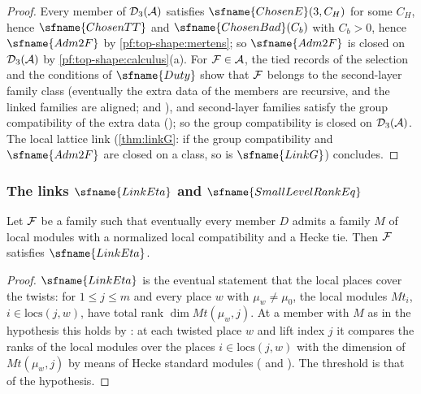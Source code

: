 \begin{proof}
Every member of $\mathcal{D}_3(\mathcal A)$ satisfies $\sfname{ChosenE}(3,C_H)$ for some $C_H$, hence
$\sfname{ChosenTT}$ and $\sfname{ChosenBad}(C_b)$ with $C_b>0$, hence $\sfname{Adm2F}$ by \cref{pf:top-shape:mertens};
so $\sfname{Adm2F}$ is closed on $\mathcal{D}_3(\mathcal A)$ by \cref{pf:top-shape:calculus}(a). For
$\mathcal{F}\in\mathcal A$, the tied records of the selection and the conditions of $\sfname{Duty}$ show that
$\mathcal{F}$ belongs to the second-layer family class (eventually the extra data of the members are recursive,
and the linked families are aligned;  and ),
and second-layer families satisfy the group compatibility of the extra data
(); so the group compatibility is closed on
$\mathcal{D}_3(\mathcal A)$. The local lattice link  (\cref{thm:linkG}: if the
group compatibility and $\sfname{Adm2F}$ are closed on a class, so is $\sfname{LinkG}$) concludes.
\end{proof}

\subsubsection*{The links $\sfname{LinkEta}$ and $\sfname{SmallLevelRankEq}$}

\begin{lemma}\label{pf:top-shape:etaclosed}
Let $\mathcal{F}$ be a family such that eventually every member $D$ admits a family $M$ of local modules with a
normalized local compatibility and a Hecke tie. Then $\mathcal{F}$ satisfies $\sfname{LinkEta}$.
\end{lemma}

\begin{proof}
$\sfname{LinkEta}$ is the eventual statement that the local places cover the twists: for $1\le j\le m$ and every place
$w$ with $\mu_w\ne\mu_0$, the local modules $\mathit{Mt}_i$, $i\in\mathrm{locs}(j,w)$, have total rank
$\dim\mathit{Mt}(\mu_w,j)$. At a member with $M$ as in the hypothesis this holds by
: at each twisted place $w$ and lift index $j$ it compares the ranks of the
local modules over the places $i\in\mathrm{locs}(j,w)$ with the dimension of $\mathit{Mt}(\mu_w,j)$ by means of Hecke
standard modules ( and ).
The threshold is that of the hypothesis.
\end{proof}

